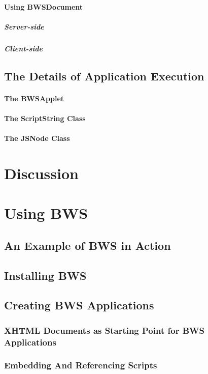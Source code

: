    \paragraph{Using BWSDocument}
    \subparagraph{Server-side}
    \subparagraph{Client-side}
  \subsection{The Details of Application Execution}
   \paragraph{The BWSApplet}
   \paragraph{The ScriptString Class}
   \paragraph{The JSNode Class}
\section{Discussion}

\section{Using BWS}

 \subsection{An Example of BWS in Action}
 \subsection{Installing BWS}
 \subsection{Creating BWS Applications}
  \subsubsection{XHTML Documents as Starting Point for BWS Applications}
  
  
  
  \subsubsection{Embedding And Referencing Scripts}

